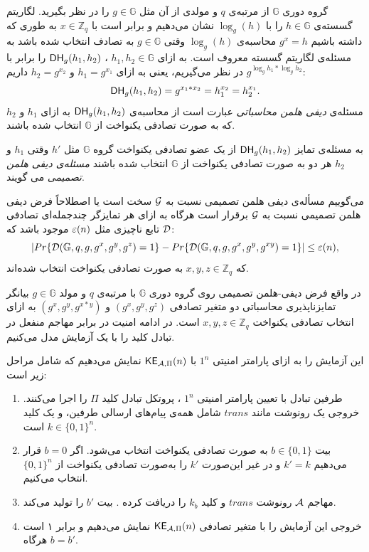 گروه دوری 
$\mathbb{G}$
از مرتبه‌ی 
$q$
 و مولدی از آن مثل 
 $g\in\mathbb{G}$
 را در نظر بگیرید.  لگاریتم گسسته‌ی 
 $h\in\mathbb{G}$
 را با 
 $\log_{g}(h)$
 نشان می‌دهیم و برابر است با 
 $x\in\mathbb{Z}_{q}$
 به طوری که داشته باشیم
 $g^{x} = h$
 محاسبه‌ی 
 $\log_{g}(h)$
 وقتی 
 $g\in\mathbb{G}$
 به تصادف  انتخاب شده باشد به مسئله‌ی لگاریتم گسسته معروف است. به ازای 
 $h_{1}, h_{2}\in\mathbb{G}$
 ، 
 $\mathsf{DH}_{g}(h_{1}, h_{2})$
 را برابر با 
 $g^{\log_{g}h_{1}*\log_{g}h_{2}}$
 	در نظر می‌گیریم،  یعنی به ازای 
 	$h_{1} = g^{x_{1}}$
 	و 
 	$h_{2} = g^{x_{2}}$
 	داریم:
 	$$\mathsf{DH}_{g}(h_{1}, h_{2}) = g^{x_{1}*x_{2}} = h_{1}^{x_{2}} = h_{2}^{x_{1}}.$$
 مسئله‌ی 
\textit{ دیفی هلمن محاسباتی }
 عبارت است از محاسبه‌ی 
 $\mathsf{DH}_{g}(h_{1}, h_{2})$
 به ازای 
 $h_{1}$
 و 
 $h_{2}$
 که به صورت تصادفی یکنواخت از 
 $\mathbb{G}$
  انتخاب شده‌ باشند. 

به مسئله‌ی تمایز 
$\mathsf{DH}_{g}(h_{1}, h_{2})$
از یک عضو تصادفی یکنواخت گروه
$\mathbb{G}$
 مثل 
 $h'$
 وقتی 
$h_{1}$
و
$h_{2}$
هر دو به صورت تصادفی یکنواخت از 
$\mathbb{G}$
انتخاب شده باشند 
\textit{  مسئله‌ی دیفی هلمن تصمیمی }
می گویند.
\begin{definition}
می‌گوییم مسأله‌ی دیفی هلمن تصمیمی نسبت به 
${\mathcal G}$
سخت است یا اصطلاحاً فرض دیفی هلمن تصمیمی نسبت به 
${\mathcal G}$
برقرار است هرگاه به ازای هر تمایزگر چندجمله‌ای تصادفی 
$\mathcal{D}$
تابع ناچیزی مثل 
$\varepsilon(n)$
موجود باشد که:
$$|Pr\{\mathcal{D}(\mathbb{G}, q, g, g^{x}, g^{y}, g^{z}) = 1\} - Pr\{\mathcal{D}(\mathbb{G}, q, g, g^{x}, g^{y}, g^{xy}) = 1\} |\leq \varepsilon(n),$$
که 
$x, y, z\in\mathbb{Z}_{q}$
به صورت تصادفی یکنواخت انتخاب شده‌اند. 
\end{definition}
 در واقع  فرض دیفی-هلمن تصمیمی روی گروه دوری
 $\mathbb{G}$
 با مرتبه‌ی 
 $q$
 و مولد 
 $g\in\mathbb{G}$
  بیانگر تمایزناپذیری محاسباتی دو متغیر تصادفی 
 $(g^{x}, g^{y}, g^{z})$
 و
 $(g^{x}, g^{y}, g^{x*y})$
 به ازای انتخاب تصادفی یکنواخت  
  $x, y, z\in\mathbb{Z}_{q}$
است. در ادامه امنیت در برابر مهاجم منفعل در تبادل کلید را با یک آزمایش مدل می‌کنیم.
\begin{definition}
	این آزمایش را به ازای پارامتر امنیتی 
	$1^{n}$
		با 
		$\mathsf{KE}_{\mathcal{A},\Pi}(n)$
		نمایش می‌دهیم که شامل مراحل زیر است:
\begin{enumerate}
\item
طرفین تبادل با تعیین پارامتر امنیتی 
$1^{n}$
، پروتکل تبادل کلید 
$\Pi$
را اجرا می‌کنند. خروجی یک رونوشت مانند 
$trans$
شامل همه‌ی پیام‌های ارسالی طرفین، و یک کلید 
$k\in\{0, 1\}^{n}$
است.
\item
بیت 
$b\in\{0, 1\}$
به صورت تصادفی یکنواخت انتخاب می‌شود. اگر 
$b = 0$
قرار می‌دهیم
$k' = k$
و در غیر این‌صورت 
$k'$
را به‌صورت تصادفی یکنواخت از 
$\{0, 1\}^{n}$
انتخاب می‌کنیم. 
\item
مهاجم 
$\mathcal{A}$
رونوشت 
$trans$
و کلید 
$k_{b}$
را دریافت کرده . بیت 
$b'$
را تولید می‌کند.
\item
خروجی این آزمایش را با متغیر تصادفی 
$\mathsf{KE}_{\mathcal{A},\Pi}(n)$
نمایش می‌دهیم و برابر ۱ است هرگاه 
$b = b'$.
\end{enumerate}

\end{definition}

